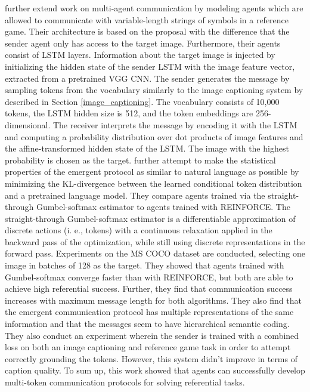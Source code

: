 \cite{havrylov2017emergence} further extend work on multi-agent communication by modeling agents which are allowed to communicate with variable-length strings of symbols in a reference game. 
Their architecture is based on the proposal \cite{lazaridou2016multi} with the difference that the sender agent only has access to the target image. Furthermore, their agents consist of LSTM layers. Information about the target image is injected by initializing the hidden state of the sender LSTM with the image feature vector, extracted from a pretrained VGG CNN. The sender generates the message by sampling tokens from the vocabulary similarly to the image captioning system by \cite{vinyals2015show} described in Section \ref{image_captioning}. The vocabulary consists of 10,000 tokens, the LSTM hidden size is 512, and the token embeddings are 256-dimensional. 
The receiver interprets the message by encoding it with the LSTM and computing a probability distribution over dot products of image features and the affine-transformed hidden state of the LSTM. The image with the highest probability is chosen as the target. \cite{havrylov2017emergence} further attempt to make the statistical properties of the emergent protocol as similar to natural language as possible by minimizing the KL-divergence between the learned conditional token distribution and a pretrained language model.
They compare agents trained via the straight-through Gumbel-softmax estimator to agents trained with REINFORCE. The straight-through Gumbel-softmax estimator is a differentiable approximation of discrete actions (i. e., tokens) with a continuous relaxation applied in the backward pass of the optimization, while still using discrete representations in the forward pass. 
Experiments on the MS COCO dataset are conducted, selecting one image in batches of 128 as the target. They showed that agents trained with Gumbel-softmax converge faster than with REINFORCE, but both are able to achieve high referential success. Further, they find that communication success increases with maximum message length for both algorithms. They also find that the emergent communication protocol has multiple representations of the same information and that the messages seem to have hierarchical semantic coding. They also conduct an experiment wherein the sender is trained with a combined loss on both an image captioning and reference game task in order to attempt correctly grounding the tokens. However, this system didn't improve in terms of caption quality. To sum up, this work showed that agents can successfully develop multi-token communication protocols for solving referential tasks.

